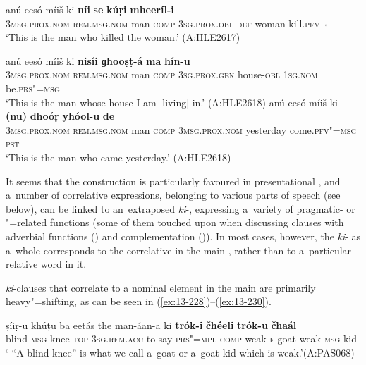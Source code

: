 \ea
\label{ex:13-225}
\gll anú eesó míiš ki \textbf{níi} \textbf{se} \textbf{kúṛi} \textbf{mheeríl-i}\\
\textsc{3msg.prox.nom} \textsc{rem.msg.nom} man \textsc{comp} \textsc{3sg.prox.obl} \textsc{def} woman kill.\textsc{pfv-f}\\
\glt `This is the man who killed the woman.' (A:HLE2617)

\ex
\label{ex:13-226}
\gll anú eesó míiš ki \textbf{nisíi} \textbf{ɡhooṣṭ-á} \textbf{ma} \textbf{hín-u}\\
\textsc{3msg.prox.nom} \textsc{rem.msg.nom} man \textsc{comp} \textsc{3sg.prox.gen} house-\textsc{obl} \textsc{1sg.nom} be.\textsc{prs"=msg}\\
\glt `This is the man whose house I am [living] in.' (A:HLE2618) 
\ex
\label{ex:13-227}
\gll anú eesó míiš ki \textbf{(nu)} \textbf{dhoóṛ} \textbf{yhóol-u} \textbf{de}\\
\textsc{3msg.prox.nom} \textsc{rem.msg.nom} man \textsc{comp} \textsc{3msg.prox.nom} yesterday come.\textsc{pfv"=msg} \textsc{pst}\\
\glt `This is the man who came yesterday.' (A:HLE2618) 
\z

It seems that the construction is particularly favoured in presentational , and a~number of correlative expressions, belonging to various parts of speech (see below), can be linked to an~extraposed \textit{ki}-, expressing a~variety of pragmatic- or "=related functions (some of them touched upon when discussing clauses with adverbial functions () and complementation ()). In most cases, however, the \textit{ki}- as a~whole corresponds to the correlative in the main , rather than to a~particular relative word in it.

 \textit{ki}-clauses that correlate to a nominal element in the main  are primarily heavy"=shifting, as can be seen in (\ref{ex:13-228})--(\ref{ex:13-230}).

\ea
\label{ex:13-228}
\gll ṣíiṛ-u khúṭu ba eetás the  man-áan-a ki \textbf{trók-i} \textbf{čhéeli} \textbf{trók-u} \textbf{čhaál} \\
blind-\textsc{msg} knee \textsc{top} \textsc{3sg.rem.acc} to say-\textsc{prs"=mpl} \textsc{comp} weak-\textsc{f} goat weak-\textsc{msg} kid \\
\glt ` ``A blind knee'' is what we call a~goat or a~goat kid which is weak.'\newline (A:PAS068)

